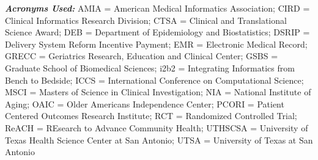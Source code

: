 \begin{enumerate}
  \emph{\textbf{Acronyms Used:}} AMIA = American Medical Informatics
  Association; CIRD = Clinical Informatics Research Division; CTSA =
  Clinical and Translational Science Award; DEB = Department of
  Epidemiology and Biostatistics; DSRIP = Delivery System Reform
  Incentive Payment; EMR = Electronic Medical Record; GRECC = Geriatrics
  Research, Education and Clinical Center; GSBS = Graduate School of
  Biomedical Sciences; i2b2 = Integrating Informatics from Bench to
  Bedside; ICCS = International Conference on Computational Science;
  MSCI = Masters of Science in Clinical Investigation; NIA = National
  Institute of Aging; OAIC = Older Americans Independence Center; PCORI
  = Patient Centered Outcomes Research Institute; RCT = Randomized
  Controlled Trial; ReACH = REsearch to Advance Community Health;
  UTHSCSA = University of Texas Health Science Center at San Antonio;
  UTSA = University of Texas at San Antonio

\end{enumerate}
